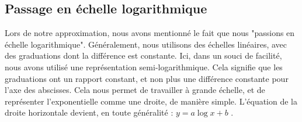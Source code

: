 \subsection{Passage en échelle logarithmique}
Lors de notre approximation, nous avons mentionné le fait que nous "passions en échelle logarithmique".
Généralement, nous utilisons des échelles linéaires, avec des graduations dont la différence est constante.
Ici, dans un souci de facilité, nous avons utilisé une représentation semi-logarithmique. Cela signifie
que les graduations ont un rapport constant, et non plus une différence constante pour l'axe des abscisses.
Cela nous permet de travailler à grande échelle, et de représenter l'exponentielle comme une droite, de
manière simple. L'équation de la droite horizontale devient, en toute généralité : $y=a\log{x}+b$ .


